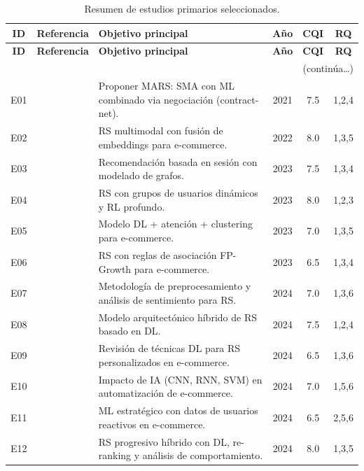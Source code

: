 \documentclass[12pt, a4paper]{article}
\begin{document}
\begin{longtable}{clp{5.2cm}ccc}
\caption{Resumen de estudios primarios seleccionados.\label{tab:estudios}}\\
\toprule
\textbf{ID} & \textbf{Referencia} & \textbf{Objetivo principal} &
\textbf{A\~no} & \textbf{CQI} & \textbf{RQ} \\
\midrule
\endfirsthead
\toprule
\textbf{ID} & \textbf{Referencia} & \textbf{Objetivo principal} &
\textbf{A\~no} & \textbf{CQI} & \textbf{RQ} \\
\midrule
\endhead
\midrule\multicolumn{6}{r}{\small(contin\'ua\ldots)}\\\endfoot
\bottomrule\endlastfoot
E01 & \cite{Alhejaili2021}  &
  Proponer MARS: SMA con ML combinado via negociaci\'on (contract-net).
  & 2021 & 7.5 & 1,2,4 \\
E02 & \cite{Wroblewska2022} &
  RS multimodal con fusi\'on de embeddings para e-commerce.
  & 2022 & 8.0 & 1,3,5 \\
E03 & \cite{Delianidi2023}  &
  Recomendaci\'on basada en sesi\'on con modelado de grafos.
  & 2023 & 7.5 & 1,3,4 \\
E04 & \cite{Zhang2023RL}    &
  RS con grupos de usuarios din\'amicos y RL profundo.
  & 2023 & 8.0 & 1,2,3 \\
E05 & \cite{LiW2023}        &
  Modelo DL + atenci\'on + clustering para e-commerce.
  & 2023 & 7.0 & 1,3,5 \\
E06 & \cite{Loukili2023}    &
  RS con reglas de asociaci\'on FP-Growth para e-commerce.
  & 2023 & 6.5 & 1,3,4 \\
E07 & \cite{Antal2024}      &
  Metodolog\'ia de preprocesamiento y an\'alisis de sentimiento para RS.
  & 2024 & 7.0 & 1,3,6 \\
E08 & \cite{Lampa2024}      &
  Modelo arquitect\'onico h\'ibrido de RS basado en DL.
  & 2024 & 7.5 & 1,2,4 \\
E09 & \cite{Nagraj2024}     &
  Revisi\'on de t\'ecnicas DL para RS personalizados en e-commerce.
  & 2024 & 6.5 & 1,3,6 \\
E10 & \cite{Halachev2024}   &
  Impacto de IA (CNN, RNN, SVM) en automatizaci\'on de e-commerce.
  & 2024 & 7.0 & 1,5,6 \\
E11 & \cite{Rosenfeld2024}  &
  ML estrat\'egico con datos de usuarios reactivos en e-commerce.
  & 2024 & 6.5 & 2,5,6 \\
E12 & \cite{Gupta2024}      &
  RS progresivo h\'ibrido con DL, re-ranking y an\'alisis de comportamiento.
  & 2024 & 8.0 & 1,3,5 \\

\end{longtable}
\end{document}
